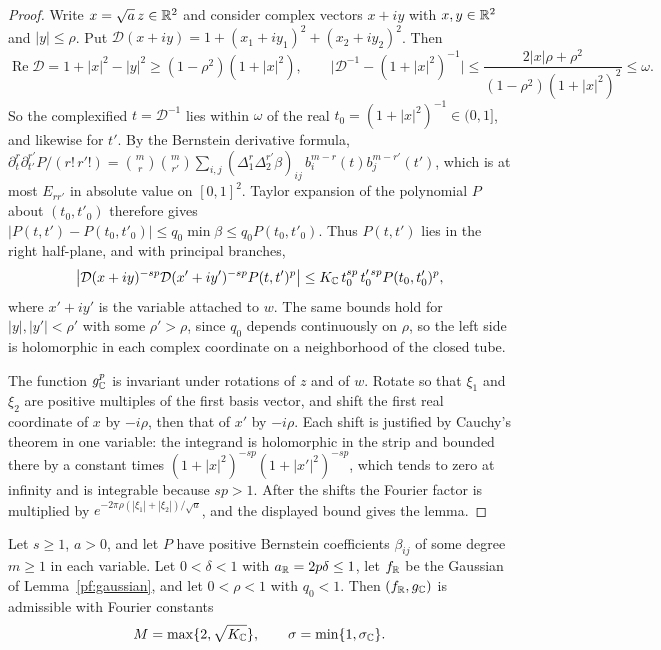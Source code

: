 \begin{proof}
Write $x=\sqrt a\,z\in\mathbb R^2$ and consider complex vectors $x+iy$ with
$x,y\in\mathbb R^2$ and $|y|\le\rho$. Put
$\mathcal D(x+iy)=1+(x_1+iy_1)^2+(x_2+iy_2)^2$. Then
\[
 \operatorname{Re}\mathcal D=1+|x|^2-|y|^2\ge(1-\rho^2)(1+|x|^2),\qquad
 \bigl|\mathcal D^{-1}-(1+|x|^2)^{-1}\bigr|
 \le\frac{2|x|\rho+\rho^2}{(1-\rho^2)(1+|x|^2)^2}\le\omega .
\]
So the complexified $t=\mathcal D^{-1}$ lies within $\omega$ of the real
$t_0=(1+|x|^2)^{-1}\in(0,1]$, and likewise for $t'$. By the Bernstein
derivative formula,
$\partial_t^r\partial_{t'}^{r'}P/(r!\,r'!)=\binom mr\binom m{r'}
\sum_{i,j}(\Delta_1^r\Delta_2^{r'}\beta)_{ij}\,b_i^{m-r}(t)b_j^{m-r'}(t')$,
which is at most $E_{rr'}$ in absolute value on $[0,1]^2$. Taylor
expansion of the polynomial $P$ about $(t_0,t'_0)$ therefore gives
$|P(t,t')-P(t_0,t'_0)|\le q_0\min\beta\le q_0P(t_0,t'_0)$. Thus
$P(t,t')$ lies in the right half-plane, and with principal branches,
\[
 \bigl|\mathcal D(x+iy)^{-sp}\mathcal D(x'+iy')^{-sp}P(t,t')^p\bigr|
 \le K_\mathbb C\,t_0^{sp}\,t_0'^{\,sp}P(t_0,t'_0)^p ,
\]
where $x'+iy'$ is the variable attached to $w$. The same bounds hold
for $|y|,|y'|<\rho'$ with some $\rho'>\rho$, since $q_0$ depends
continuously on $\rho$, so the left side is holomorphic in each complex
coordinate on a neighborhood of the closed tube.

The function $g_\mathbb C^p$ is invariant under rotations of $z$ and of $w$.
Rotate so that $\xi_1$ and $\xi_2$ are positive multiples of the first
basis vector, and shift the first real coordinate of $x$ by $-i\rho$,
then that of $x'$ by $-i\rho$. Each shift is justified by Cauchy's
theorem in one variable: the integrand is holomorphic in the strip and
bounded there by a constant times $(1+|x|^2)^{-sp}(1+|x'|^2)^{-sp}$,
which tends to zero at infinity and is integrable because $sp>1$. After
the shifts the Fourier factor is multiplied by
$e^{-2\pi\rho(|\xi_1|+|\xi_2|)/\sqrt a}$, and the displayed bound gives
the lemma.
\end{proof}

\begin{proposition}\label{pf:admissible}
Let $s\ge1$, $a>0$, and let $P$ have positive Bernstein coefficients
$\beta_{ij}$ of some degree $m\ge1$ in each variable. Let $0<\delta<1$ with
$a_\mathbb R=2p\delta\le1$, let $f_\mathbb R$ be the Gaussian of
Lemma~\ref{pf:gaussian}, and let $0<\rho<1$ with $q_0<1$. Then
$(f_\mathbb R,g_\mathbb C)$ is admissible with Fourier constants
\begin{equation}\label{pf:polynomial-fourier-contract}
 M=\max\{2,\sqrt{K_\mathbb C}\},\qquad \sigma=\min\{1,\sigma_\mathbb C\}.
\end{equation}
\end{proposition}

